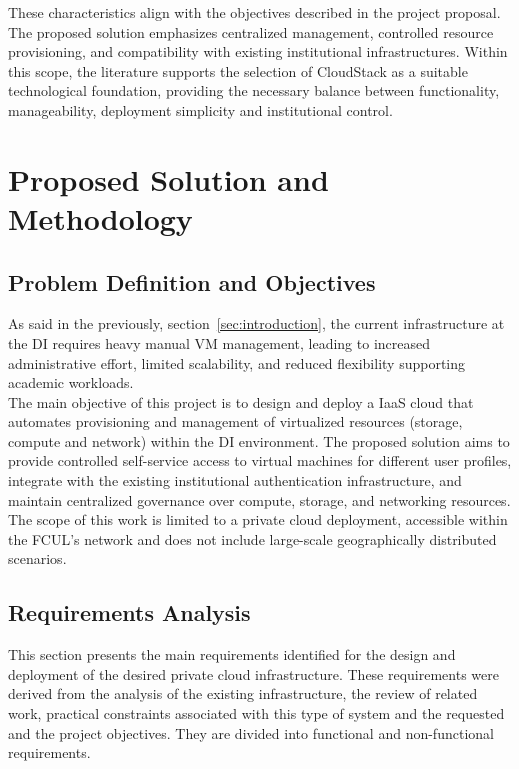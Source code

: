 \documentclass[sigplan]{acmart}
\begin{document}
            These characteristics align with the objectives described in the project proposal. The proposed solution emphasizes centralized management, controlled resource provisioning, and compatibility with existing institutional infrastructures. Within this scope, the literature supports the selection of CloudStack as a suitable technological foundation, providing the necessary balance between functionality, manageability, deployment simplicity and institutional control.

\section{Proposed Solution and Methodology} \label{sec:proposed}
    \subsection{Problem Definition and Objectives}
        As said in the previously, section~\ref{sec:introduction}, the current infrastructure at the DI requires heavy manual VM management, leading to increased administrative effort, limited scalability, and reduced flexibility supporting academic workloads.\\

        The main objective of this project is to design and deploy a IaaS cloud that automates provisioning and management of virtualized resources (storage, compute and network) within the DI environment. The proposed solution aims to provide controlled self-service access to virtual machines for different user profiles, integrate with the existing institutional authentication infrastructure, and maintain centralized governance over compute, storage, and networking resources. The scope of this work is limited to a private cloud deployment, accessible within the FCUL's network and does not include large-scale geographically distributed scenarios.\\


    \subsection{Requirements Analysis}
        This section presents the main requirements identified for the design and deployment of the desired private cloud infrastructure. These requirements were derived from the analysis of the existing infrastructure, the review of related work, practical constraints associated with this type of system and the requested and the project objectives. They are divided into functional and non-functional requirements.
    
\end{document}
